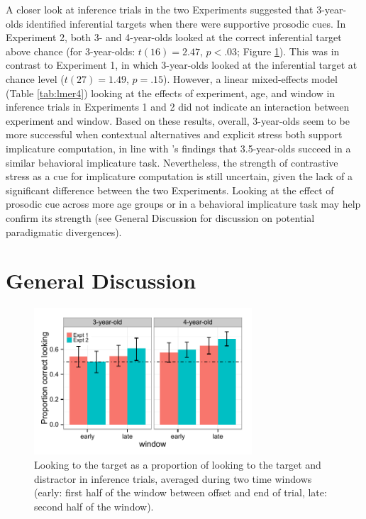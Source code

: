 \documentclass[10pt,letterpaper]{article}
\begin{document}
A closer look at inference trials in the two Experiments suggested that 3-year-olds identified inferential targets when there were supportive prosodic cues. In Experiment 2, both 3- and 4-year-olds looked at the correct inferential target above chance (for 3-year-olds: $t(16) = 2.47$, $p < .03$; Figure \ref{fig:0prosbar}). This was in contrast to Experiment 1, in which 3-year-olds looked at the inferential target at chance level ($t(27) = 1.49$, $p = .15$). However, a linear mixed-effects model (Table \ref{tab:lmer4}) looking at the effects of experiment, age, and window in inference trials in Experiments 1 and 2 did not indicate an interaction between experiment and window. Based on these results, overall, 3-year-olds seem to be more successful when contextual alternatives and explicit stress both support implicature computation, in line with 's findings that 3.5-year-olds succeed in a similar behavioral implicature task. Nevertheless, the strength of contrastive stress as a cue for implicature computation is still uncertain, given the lack of a significant difference between the two Experiments. Looking at the effect of prosodic cue across more age groups or in a behavioral implicature task may help confirm its strength (see General Discussion for discussion on potential paradigmatic divergences). 

\section{General Discussion}

\begin{figure}[t]
\begin{center} 
\includegraphics[width=3.2in]{figures/expt12-accuracy_inf.pdf}
\caption{\label{fig:0prosbar} Looking to the target as a proportion of looking to the target and distractor in inference trials, averaged during two time windows (early: first half of the window between offset and end of trial, late: second half of the window).}
\end{center} 
\end{figure}
\end{document}
